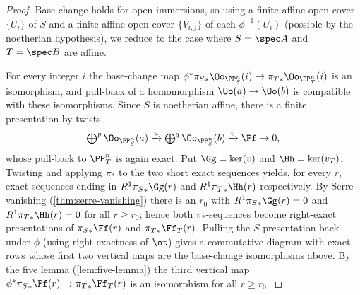 \begin{proof}
  Base change holds for open immersions, so using a finite affine open cover
  $\{U_i\}$ of $S$ and a finite affine open cover $\{V_{i,j}\}$ of each
  $\phi^{-1}(U_i)$ (possible by the noetherian hypothesis), we reduce to the case
  where $S = \spec A$ and $T = \spec B$ are affine.

  For every integer $i$ the base-change map
  $\phi^*{\pi_S}_*\Oo_{\PP^n_S}(i)\to {\pi_T}_*\Oo_{\PP^n_T}(i)$ is an
  isomorphism, and pull-back of a homomorphism $\Oo(a)\to\Oo(b)$ is compatible
  with these isomorphisms. Since $S$ is noetherian affine, there is a finite
  presentation by twists
  \[
    \textstyle\bigoplus^p \Oo_{\PP^n_S}(a)\xrightarrow{u}
    \bigoplus^q \Oo_{\PP^n_S}(b)\xrightarrow{v}\Ff\to 0,
  \]
  whose pull-back to $\PP^n_T$ is again exact. Put $\Gg=\ker(v)$ and
  $\Hh=\ker(v_T)$. Twisting and applying $\pi_*$ to the two short exact sequences
  yields, for every $r$, exact sequences ending in $R^1{\pi_S}_*\Gg(r)$ and
  $R^1{\pi_T}_*\Hh(r)$ respectively. By Serre vanishing
  (\cref{thm:serre-vanishing}) there is an $r_0$ with $R^1{\pi_S}_*\Gg(r)=0$ and
  $R^1{\pi_T}_*\Hh(r)=0$ for all $r\ge r_0$; hence both $\pi_*$-sequences become
  right-exact presentations of ${\pi_S}_*\Ff(r)$ and ${\pi_T}_*\Ff_T(r)$.
  Pulling the $S$-presentation back under $\phi$ (using right-exactness of
  $\ot$) gives a commutative diagram with exact rows whose first two vertical
  maps are the base-change isomorphisms above. By the five lemma
  (\cref{lem:five-lemma}) the third vertical map
  $\phi^*{\pi_S}_*\Ff(r)\to{\pi_T}_*\Ff_T(r)$ is an isomorphism for all
  $r\ge r_0$.
\end{proof}

